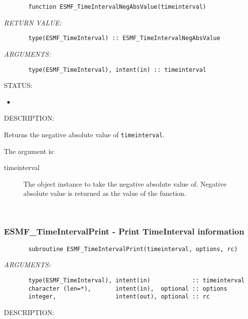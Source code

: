 
\begin{verbatim}       function ESMF_TimeIntervalNegAbsValue(timeinterval)
 \end{verbatim}{\em RETURN VALUE:}
\begin{verbatim}       type(ESMF_TimeInterval) :: ESMF_TimeIntervalNegAbsValue
 \end{verbatim}{\em ARGUMENTS:}
\begin{verbatim}       type(ESMF_TimeInterval), intent(in) :: timeinterval
 \end{verbatim}
{\sf STATUS:}
   \begin{itemize}
   \item{}
   \end{itemize}
  
{\sf DESCRIPTION:\\ }


       Returns the negative absolute value of {\tt timeinterval}.
  
       The argument is:
       \begin{description}
       \item[timeinterval]
            The object instance to take the negative absolute value of.
            Negative absolute value is returned as the value of the function.
       \end{description}
   
 
\mbox{}\hrulefill\ 
 
\subsubsection [ESMF\_TimeIntervalPrint] {ESMF\_TimeIntervalPrint - Print TimeInterval information}


 
\begin{verbatim}       subroutine ESMF_TimeIntervalPrint(timeinterval, options, rc)
 \end{verbatim}{\em ARGUMENTS:}
\begin{verbatim}       type(ESMF_TimeInterval), intent(in)            :: timeinterval
       character (len=*),       intent(in),  optional :: options
       integer,                 intent(out), optional :: rc
 \end{verbatim}
{\sf DESCRIPTION:\\ }


